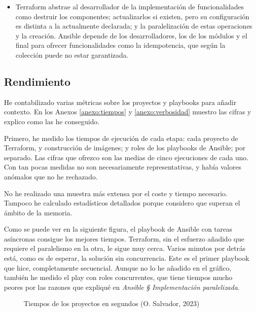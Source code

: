 \documentclass[11pt]{article}
\begin{document}
\begin{flushleft}
\begin{itemize}
            \item Terraform abstrae al desarrollador de la implementación de funcionalidades como destruir los componentes; actualizarlos si existen, pero su configuración es distinta a la actualmente declarada; y la paralelización de estas operaciones y la creación. Ansible depende de los desarrolladores, los de los módulos y el final para ofrecer funcionalidades como la idempotencia, que según la colección puede no estar garantizada. 
            \linebreak            
		\end{itemize}

\bigskip
\bigskip
\subsection{Rendimiento}
He contabilizado varias métricas sobre los proyectos y playbooks para añadir contexto. En los Anexos \ref{anexo:tiempos} y \ref{anexo:verbosidad} muestro las cifras y explico como las he conseguido. 
\linebreak

Primero, he medido los tiempos de ejecución de cada etapa: cada proyecto de Terraform, y construcción de imágenes; y roles de los playbooks de Ansible; por separado. Las cifras que ofrezco son las medias de cinco ejecuciones de cada uno. Con tan pocas medidas no son necesariamente representativas, y había valores anómalos que no he rechazado. 
\linebreak

No he realizado una muestra más extensa por el coste y tiempo necesario. Tampoco he calculado estadísticos detallados porque considero que superan el ámbito de la memoria.
\linebreak

Como se puede ver en la siguiente figura, el playbook de Ansible con tareas asíncronas consigue los mejores tiempos. Terraform, sin el esfuerzo añadido que requiere el paralelismo en la otra, le sigue muy cerca. Varios minutos por detrás está, como es de esperar, la solución sin concurrencia. Este es el primer playbook que hice, completamente secuencial. Aunque no lo he añadido en el gráfico, también he medido el play con roles concurrentes, que tiene tiempos mucho peores por las razones que expliqué en \textit{Ansible § Implementación paralelizada}.
\linerbeak

    \begin{figure}[htb]
        \centering
        \caption{Tiempos de los proyectos en segundos (O. Salvador, 2023)}
    \end{figure}


\end{flushleft}
\end{document}
